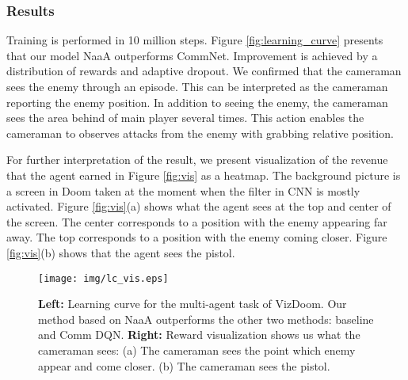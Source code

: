 \subsubsection{Results}
Training is performed in 10 million steps.
Figure \ref{fig:learning_curve} presents that our model NaaA outperforms CommNet.
Improvement is achieved by a distribution of rewards and adaptive dropout.
We confirmed that the cameraman sees the enemy through an episode.
This can be interpreted as the cameraman reporting the enemy position.
In addition to seeing the enemy, the cameraman sees the area behind of main player several times.
This action enables the cameraman to observes attacks from the enemy with grabbing relative position.

For further interpretation of the result, 
we present visualization of the revenue that the agent earned in Figure \ref{fig:vis} as a heatmap.
The background picture is a screen in Doom taken at the moment when the filter in CNN is mostly activated.
Figure \ref{fig:vis}(a) shows what the agent sees at the top and center of the screen.
The center corresponds to a position with the enemy appearing far away.
The top corresponds to a position with the enemy coming closer.
Figure \ref{fig:vis}(b) shows that the agent sees the pistol.

%
\begin{figure*}[t]
\centering
\texttt{[image: img/lc\_vis.eps]}
\caption{
	\textbf{Left:}
		Learning curve for the multi-agent task of VizDoom. 
		Our method based on NaaA outperforms the other two methods: baseline and Comm DQN.
	\textbf{Right:} 
		Reward visualization shows us what the cameraman sees:
		(a) The cameraman sees the point which enemy appear and come closer.
		(b) The cameraman sees the pistol.
}
\label{fig:double}
\end{figure*}


